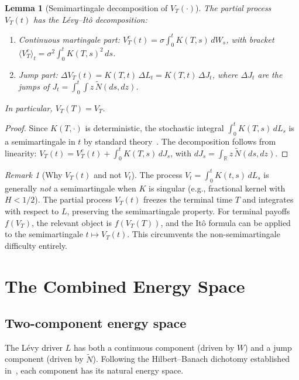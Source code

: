 \documentclass[11pt,a4paper]{article}
\theoremstyle{plain}
\newtheorem{lemma}[theorem]{Lemma}
\theoremstyle{definition}
\theoremstyle{remark}
\newtheorem{remark}[theorem]{Remark}
\newcommand{\R}{\mathbb{R}}
\newcommand{\Ntilde}{\widetilde{N}}
\begin{document}
\begin{lemma}[Semimartingale decomposition of $V_T(\cdot)$]
\label{lem:SM-decomp}
The partial process $V_T(t)$ has the L\'evy--It\^o decomposition:
\begin{enumerate}[label=(\alph*)]
\item Continuous martingale part:
  $V_T^c(t) = \sigma\int_0^t K(T,s)\,dW_s$, with bracket
  $\langle V_T^c \rangle_t = \sigma^2\int_0^t K(T,s)^2\,ds$.
\item Jump part:
  $\Delta V_T(t) = K(T,t)\,\Delta L_t = K(T,t)\,\Delta J_t$,
  where $\Delta J_t$ are the jumps of
  $J_t = \int_0^t\!\int z\,\Ntilde(ds,dz)$.
\end{enumerate}
In particular, $V_T(T) = V_T$.
\end{lemma}

\begin{proof}
Since $K(T,\cdot)$ is deterministic, the stochastic integral
$\int_0^t K(T,s)\,dL_s$ is a semimartingale in $t$ by standard
theory~\cite{Applebaum2009}.  The decomposition follows from
linearity: $V_T(t) = V_T^c(t) + \int_0^t K(T,s)\,dJ_s$,
with $dJ_s = \int_\R z\,\Ntilde(ds,dz)$.
\end{proof}

\begin{remark}[Why $V_T(t)$ and not $V_t$]\label{rem:partial}
The process $V_t = \int_0^t K(t,s)\,dL_s$ is generally
\emph{not} a semimartingale when $K$ is singular (e.g.,
fractional kernel with $H < 1/2$).  The partial process
$V_T(t)$ freezes the terminal time $T$ and integrates
with respect to $L$, preserving the semimartingale property.
For terminal payoffs $f(V_T)$, the relevant object is
$f(V_T(T))$, and the It\^o formula can be applied to the
semimartingale $t \mapsto V_T(t)$.  This circumvents the
non-semimartingale difficulty entirely.
\end{remark}


\section{The Combined Energy Space}\label{sec:energy}

\subsection{Two-component energy space}

The L\'evy driver $L$ has both a continuous component (driven
by $W$) and a jump component (driven by $\Ntilde$).  Following
the Hilbert--Banach dichotomy established
in~\cite{Fontes2026a,Fontes2026d}, each component
has its natural energy space.
\end{document}
